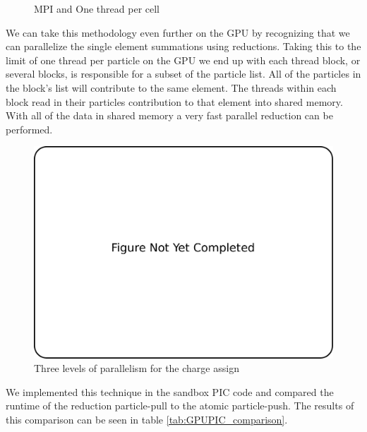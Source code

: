 \begin{figure}
\begin{center}

\end{center}
\caption{MPI and One thread per cell}
\label{fig:pic_flowchart_parallel}
\end{figure}

We can take this methodology even further on the GPU by recognizing that we can parallelize the single element summations using reductions. Taking this to the limit of one thread per particle on the GPU we end up with each thread block, or several blocks, is responsible for a subset of the particle list. All of the particles in the block's list will contribute to the same element. The threads within each block read in their particles contribution to that element into shared memory. With all of the data in shared memory a very fast parallel reduction can be performed.

\begin{figure}
\begin{center}
\includegraphics[width=5in]{introduction/not_finished.pdf}
\end{center}
\caption{Three levels of parallelism for the charge assign}
\label{fig:pic_flowchart_parallel}
\end{figure}

We implemented this technique in the sandbox PIC code and compared the runtime of the reduction particle-pull to the atomic particle-push. The results of this comparison can be seen in table \ref{tab:GPUPIC_comparison}.

